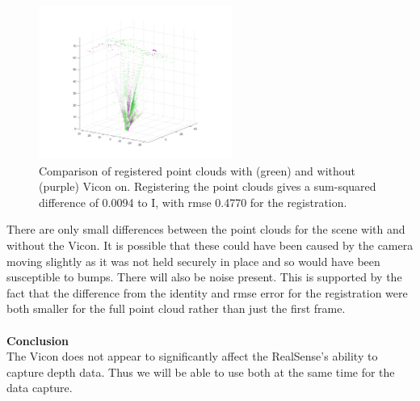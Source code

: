 \documentclass[12pt,a4paper]{article}
\begin{document}
	\begin{figure}[h]
		\centering
		\includegraphics[height=50mm, trim = 20mm 20mm 20mm 20mm, clip]{full_compare.png}
		\caption{Comparison of registered point clouds with (green) and without (purple) Vicon on. Registering the point clouds gives a sum-squared difference of 0.0094 to I, with rmse 0.4770 for the registration.}
		\label{f: vicon all frame}
	\end{figure}
\noindent
There are only small differences between the point clouds for the scene with and without the Vicon. It is possible that these could have been caused by the camera moving slightly as it was not held securely in place and so would have been susceptible to bumps. There will also be noise present. This is supported by the fact that the difference from the identity and rmse error for the registration were both smaller for the full point cloud rather than just the first frame.
\\\\
\textbf{Conclusion} \\
The Vicon does not appear to significantly affect the RealSense's ability to capture depth data. Thus we will be able to use both at the same time for the data capture.

\newpage
\end{document}
